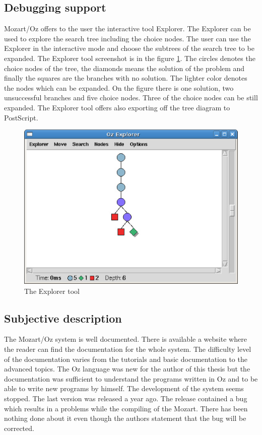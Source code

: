 \subsection{Debugging support}
Mozart/Oz offers to the user the interactive tool Explorer. The Explorer can be used to explore 
the search tree including the choice nodes. The user can use the Explorer in the 
interactive mode and choose the subtrees of the search tree to be expanded. 
 The Explorer tool screenshot is in the figure \ref{mozart:explorer}. The circles 
 denotes the choice nodes of the tree, the diamonds means the solution of
 the problem and finally the squares are the branches with no solution. The lighter color
 denotes the nodes which can be expanded. On the figure there is one solution, two 
 unsuccessful branches and five choice nodes. Three of the choice nodes can be still expanded.
 The Explorer tool offers also exporting off the tree diagram to PostScript.

\begin{figure}
\caption{\label{mozart:explorer}The Explorer tool}
\begin{center}
\includegraphics[scale=0.3]{images/screenshoty/explorer.eps}
\end{center}
\end{figure}


\subsection{Subjective description}
The Mozart/Oz system is well documented. There is available a website \cite{mozart:documentation} where the reader
can find the documentation for the whole system. The difficulty level of the documentation
varies from the tutorials and basic documentation to the advanced topics. The Oz language 
was new for the author of this thesis but the documentation was sufficient 
to understand the programs written in Oz and to be able to write new programs by
himself. The development of the system seems stopped. The last version was released
a year ago. The release contained a bug which results in a problems while the compiling
of the Mozart. There has been nothing done about it even though the authors statement
that the bug will be corrected.